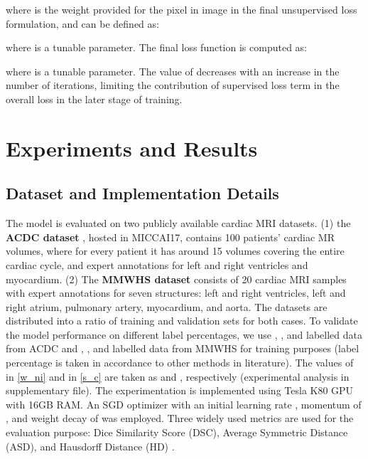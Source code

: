 \documentclass[runningheads]{llncs}
\begin{document}
where  is the weight provided for the  pixel in  image in the final unsupervised loss formulation, and can be defined as:

where  is a tunable parameter. The final loss function is computed as:

where  is a tunable parameter. The value of  decreases with an increase in the number of iterations, limiting the contribution of supervised loss term  in the overall loss in the later stage of training.   


\section{Experiments and Results}\label{results}
\subsection{Dataset and Implementation Details}
The model is evaluated on two publicly available cardiac MRI datasets. (1) the \textbf{ACDC dataset} \cite{bernard2018deep}, hosted in MICCAI17, contains 100 patients' cardiac MR volumes, where for every patient it has around 15 volumes covering the entire cardiac cycle, and expert annotations for left and right ventricles and myocardium. (2) The \textbf{MMWHS dataset} \cite{zhuang2016multi} consists of 20 cardiac MRI samples with expert annotations for seven structures: left and right ventricles, left and right atrium, pulmonary artery, myocardium, and aorta. The datasets are distributed into a  ratio of training and validation sets for both cases. To validate the model performance on different label percentages, we use , , and  labelled data from ACDC and , , and  labelled data from MMWHS for training purposes (label percentage is taken in accordance to other methods in literature). The values of  in \autoref{w_ni} and  in \autoref{s_c} are taken as  and , respectively (experimental analysis in supplementary file). The experimentation is implemented using Tesla K80 GPU with 16GB RAM. An SGD optimizer with an initial learning rate , momentum of , and weight decay of  was employed. Three widely used metrics are used for the evaluation purpose: Dice Similarity Score (DSC), Average Symmetric Distance (ASD), and Hausdorff Distance (HD) \cite{basak2022embarrassingly}. 
\end{document}
